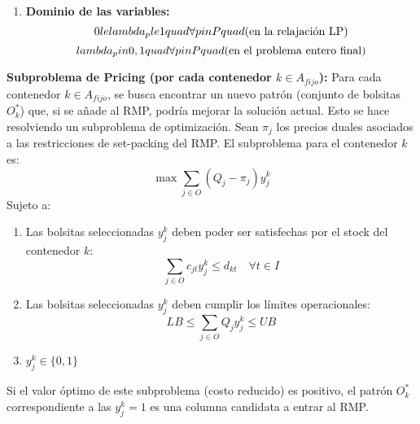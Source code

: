 \documentclass[a4paper,12pt]{article}
\begin{document}
\begin{enumerate}
    \item \textbf{Dominio de las variables:}
    \[ 0 \\le \\lambda_p \\le 1 \\quad \forall p \\in P \\quad \text{(en la relajación LP)} \]
    \[ \\lambda_p \\in \\{0, 1\\} \\quad \forall p \\in P \\quad \text{(en el problema entero final)} \]
\end{enumerate}

\textbf{Subproblema de Pricing (por cada contenedor $k \in A_{fijo}$):}
Para cada contenedor $k \in A_{fijo}$, se busca encontrar un nuevo patrón (conjunto de bolsitas $O_k^*$) que, si se añade al RMP, podría mejorar la solución actual. Esto se hace resolviendo un subproblema de optimización.
Sean $\pi_j$ los precios duales asociados a las restricciones de set-packing del RMP. El subproblema para el contenedor $k$ es:
\[ \max \sum_{j \in O} (Q_j - \pi_j) y_j^k \]
Sujeto a:
\begin{enumerate}
    \item Las bolsitas seleccionadas $y_j^k$ deben poder ser satisfechas por el stock del contenedor $k$:
    \[ \sum_{j \in O} c_{jt} y_j^k \le d_{kt} \quad \forall t \in I \]
    \item Las bolsitas seleccionadas $y_j^k$ deben cumplir los límites operacionales:
    \[ LB \le \sum_{j \in O} Q_j y_j^k \le UB \]
    \item $y_j^k \in \{0,1\}$
\end{enumerate}
Si el valor óptimo de este subproblema (costo reducido) es positivo, el patrón $O_k^*$ correspondiente a las $y_j^k=1$ es una columna candidata a entrar al RMP.
\end{document}
